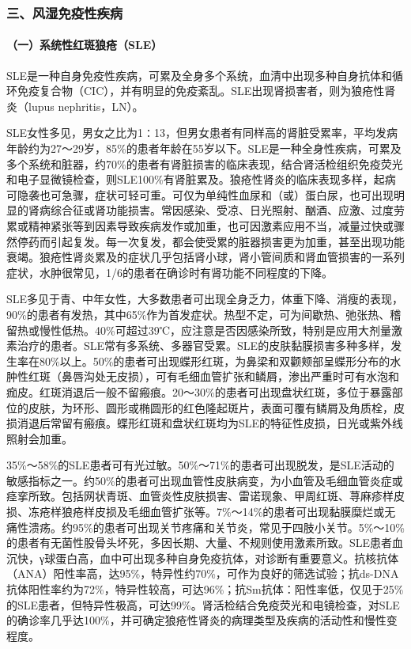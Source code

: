 \subsubsection{三、风湿免疫性疾病}

\paragraph{（一）系统性红斑狼疮（SLE）}

SLE是一种自身免疫性疾病，可累及全身多个系统，血清中出现多种自身抗体和循环免疫复合物（CIC），并有明显的免疫紊乱。SLE出现肾损害者，则为狼疮性肾炎（lupus
nephritis，LN）。

SLE女性多见，男女之比为1∶13，但男女患者有同样高的肾脏受累率，平均发病年龄约为27～29岁，85\%的患者年龄在55岁以下。SLE是一种全身性疾病，可累及多个系统和脏器，约70\%的患者有肾脏损害的临床表现，结合肾活检组织免疫荧光和电子显微镜检查，则SLE100\%有肾脏累及。狼疮性肾炎的临床表现多样，起病可隐袭也可急骤，症状可轻可重。可仅为单纯性血尿和（或）蛋白尿，也可出现明显的肾病综合征或肾功能损害。常因感染、受凉、日光照射、酗酒、应激、过度劳累或精神紧张等到因素导致疾病发作或加重，也可因激素应用不当，减量过快或骤然停药而引起复发。每一次复发，都会使受累的脏器损害更为加重，甚至出现功能衰竭。狼疮性肾炎累及的症状几乎包括肾小球，肾小管间质和肾血管损害的一系列症状，水肿很常见，1/6的患者在确诊时有肾功能不同程度的下降。

SLE多见于青、中年女性，大多数患者可出现全身乏力，体重下降、消瘦的表现，90\%的患者有发热，其中65\%作为首发症状。热型不定，可为间歇热、弛张热、稽留热或慢性低热。40\%可超过39℃，应注意是否因感染所致，特别是应用大剂量激素治疗的患者。SLE常有多系统、多器官受累。SLE的皮肤黏膜损害多种多样，发生率在80\%以上。50\%的患者可出现蝶形红斑，为鼻梁和双颧颊部呈蝶形分布的水肿性红斑（鼻唇沟处无皮损），可有毛细血管扩张和鳞屑，渗出严重时可有水泡和痂皮。红斑消退后一般不留瘢痕。20～30\%的患者可出现盘状红斑，多位于暴露部位的皮肤，为环形、圆形或椭圆形的红色隆起斑片，表面可覆有鳞屑及角质栓，皮损消退后常留有瘢痕。蝶形红斑和盘状红斑均为SLE的特征性皮损，日光或紫外线照射会加重。

35\%～58\%的SLE患者可有光过敏。50\%～71\%的患者可出现脱发，是SLE活动的敏感指标之一。约50\%的患者可出现血管性皮肤病变，为小血管及毛细血管炎症或痉挛所致。包括网状青斑、血管炎性皮肤损害、雷诺现象、甲周红斑、荨麻疹样皮损、冻疮样狼疮样皮损及毛细血管扩张等。7\%～14\%的患者可出现黏膜糜烂或无痛性溃疡。约95\%的患者可出现关节疼痛和关节炎，常见于四肢小关节。5\%～10\%的患者有无菌性股骨头坏死，多因长期、大量、不规则使用激素所致。SLE患者血沉快，γ球蛋白高，血中可出现多种自身免疫抗体，对诊断有重要意义。抗核抗体（ANA）阳性率高，达95\%，特异性约70\%，可作为良好的筛选试验；抗ds-DNA抗体阳性率约为72\%，特异性较高，可达96\%；抗Sm抗体：阳性率低，仅见于25\%的SLE患者，但特异性极高，可达99\%。肾活检结合免疫荧光和电镜检查，对SLE的确诊率几乎达100\%，并可确定狼疮性肾炎的病理类型及疾病的活动性和慢性变程度。

